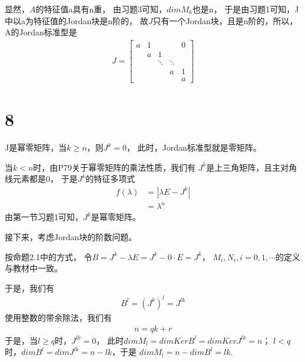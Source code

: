 \documentclass{article}
\begin{document}
显然，$A$的特征值a具有n重，
由习题3可知，$dim M_k$也是n，
于是由习题1可知，J中以a为特征值的Jordan块是n阶的，
故$J$只有一个Jordan块，且是n阶的，所以，A的Jordan标准型是
\begin{align*}
  J = \begin{bmatrix}
        a & 1 &        &        & 0 \\
          & a & 1      &        &   \\
          &   & \ddots & \ddots &   \\
          &   &        & a      & 1 \\
          &   &        &        & a
      \end{bmatrix}
\end{align*}

\section*{8}

J是幂零矩阵，当$k \geq n$，则$J^k = 0$，
此时，Jordan标准型就是零矩阵。

当$k < n$时，由P79关于幂零矩阵的乘法性质，我们有
$J^k$是上三角矩阵，且主对角线元素都是0，
于是$J^k$的特征多项式
\begin{align*}
  f(\lambda) & = |\lambda E - J^k| \\
             & = \lambda^n
\end{align*}
由第一节习题1可知，$J^k$是幂零矩阵。

接下来，考虑Jordan块的阶数问题。

按命题2.1中的方式，
令$B = J^k - \lambda E = J^k - 0 \cdot E = J^k$，
$M_i, N_i, i = 0, 1, \cdots$的定义与教材中一致。

于是，我们有
\begin{align*}
  B^l = (J^k)^l = J^{lk}
\end{align*}
使用整数的带余除法，我们有
\begin{align*}
  n = q k + r
\end{align*}
于是，当$l \geq q$时，$J^{lk} = 0$，
此时$dim M_l = dim Ker B^l = dim Ker J^{lk} = n$；
$l < q$时，$dim B^l = dim J^{lk} = n - lk$，于是
$dim M_l = n - dim B^l = lk$.
\end{document}

